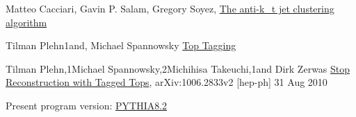 \documentclass[12pt,a4paper]{article}		%
\begin{document}
\begin{thebibliography}{}
	 Matteo Cacciari, Gavin P. Salam, Gregory Soyez, \href{https://arxiv.org/abs/0802.1189}{The anti-k_t jet clustering algorithm} 
	
	 Tilman  Plehn1and, Michael Spannowsky \href{https://arxiv.org/pdf/1112.4441.pdf}{Top Tagging}
	
	 Tilman Plehn,1Michael Spannowsky,2Michihisa Takeuchi,1and Dirk Zerwas \href{https://arxiv.org/pdf/1006.2833.pdf}{Stop Reconstruction with Tagged Tops}, arXiv:1006.2833v2 [hep-ph] 31 Aug 2010
	
	 Present program version: \href{http://home.thep.lu.se/~torbjorn/Pythia.html}{PYTHIA8.2}
\end{thebibliography} 
\end{document}
